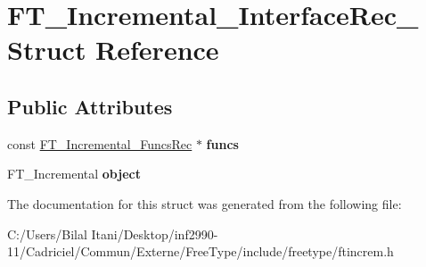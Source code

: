 \hypertarget{struct_f_t___incremental___interface_rec__}{}\section{F\+T\+\_\+\+Incremental\+\_\+\+Interface\+Rec\+\_\+ Struct Reference}
\label{struct_f_t___incremental___interface_rec__}
\subsection*{Public Attributes}
\begin{DoxyCompactItemize}
\item 
const \hyperlink{struct_f_t___incremental___funcs_rec__}{F\+T\+\_\+\+Incremental\+\_\+\+Funcs\+Rec} $\ast$ {\bfseries funcs}\hypertarget{struct_f_t___incremental___interface_rec___acd254ae2bdd80b4c9218a484c6bc2a41}{}\label{struct_f_t___incremental___interface_rec___acd254ae2bdd80b4c9218a484c6bc2a41}

\item 
F\+T\+\_\+\+Incremental {\bfseries object}\hypertarget{struct_f_t___incremental___interface_rec___ae4f527f53465ff84ad01b484fe721a88}{}\label{struct_f_t___incremental___interface_rec___ae4f527f53465ff84ad01b484fe721a88}

\end{DoxyCompactItemize}


The documentation for this struct was generated from the following file\+:\begin{DoxyCompactItemize}
\item 
C\+:/\+Users/\+Bilal Itani/\+Desktop/inf2990-\/11/\+Cadriciel/\+Commun/\+Externe/\+Free\+Type/include/freetype/ftincrem.\+h\end{DoxyCompactItemize}
